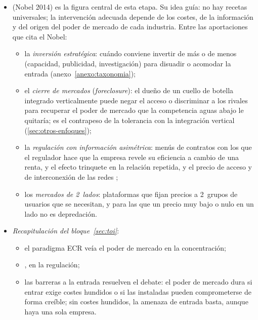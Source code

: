 \documentclass[11pt]{article}
\begin{document}
\begin{itemize}
\item \emph{} (Nobel 2014) es la figura central de esta etapa. Su idea guía: no hay recetas universales; la intervención adecuada depende de los costes, de la información y del origen del poder de mercado de cada industria\nocite{Tirole2014Nobel}. Entre las aportaciones que cita el Nobel\nocite{Nobel2014TiroleBackground}:
  \begin{itemize}
  \item la \emph{inversión estratégica}: cuándo conviene invertir de más o de menos (capacidad, publicidad, investigación) para disuadir o acomodar la entrada\nocite{FudenbergTirole1984Fat} (anexo~\ref{anexo:taxonomia});
  \item el \emph{cierre de mercados} (\emph{foreclosure}): el dueño de un cuello de botella integrado verticalmente puede negar el acceso o discriminar a los rivales para recuperar el poder de mercado que la competencia aguas abajo le quitaría\nocite{HartTirole1990Vertical}; es el contrapeso de la tolerancia con la integración vertical (\ref{sec:otros-enfoques});
  \item la \emph{regulación con información asimétrica}: menús de contratos con los que el regulador hace que la empresa revele su eficiencia a cambio de una renta, y el efecto trinquete en la relación repetida\nocite{LaffontTirole1986Using,LaffontTirole1993Theory}, y el precio de acceso y de interconexión de las redes\nocite{LaffontReyTirole1998NetworkI,LaffontTirole2000Competition}  ;
  \item los \emph{mercados de 2~lados}: plataformas que fijan precios a 2~grupos de usuarios que se necesitan, y para las que un precio muy bajo o nulo en un lado no es depredación\nocite{RochetTirole2003Platform}.
  \end{itemize}
\end{itemize}

\begin{itemize}
\item \emph{Recapitulación del bloque~\ref{sec:toi}}:
  \begin{itemize}
  \item el paradigma ECR veía el poder de mercado en la concentración;
  \item {}, en la regulación;
  \item las barreras a la entrada resuelven el debate: el poder de mercado dura si entrar exige costes hundidos o si las instaladas pueden comprometerse de forma creíble; sin costes hundidos, la amenaza de entrada basta, aunque haya una sola empresa.
  \end{itemize}
\end{itemize}
\end{document}
